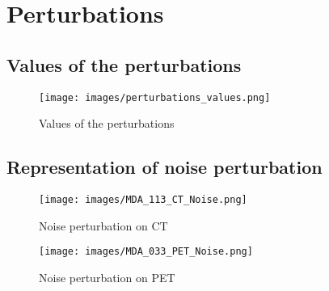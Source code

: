 \chapter{Perturbations}

\label{chap:Pert}
\section{Values of the perturbations}


\begin{figure}[ht]
    \centering
    \texttt{[image: images/perturbations\_values.png]}
    \caption{Values of the perturbations}
\end{figure}

\clearpage
\section{Representation of noise perturbation}
\begin{figure}[ht]
    \centering
    \texttt{[image: images/MDA\_113\_CT\_Noise.png]}
    \caption{Noise perturbation on CT}
\end{figure}
\begin{figure}[ht]
    \centering
    \texttt{[image: images/MDA\_033\_PET\_Noise.png]}
    \caption{Noise perturbation on PET}
\end{figure}

